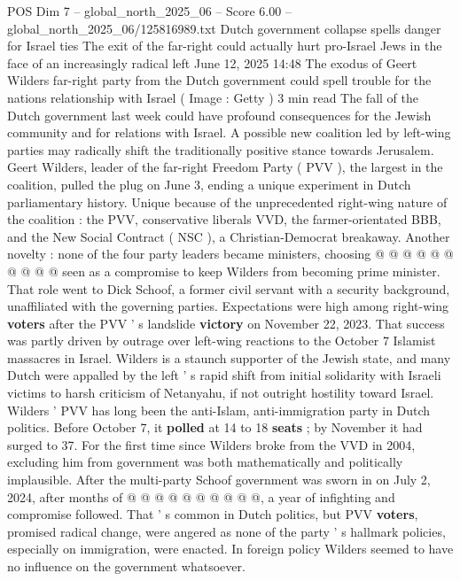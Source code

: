 \begin{textsample}{POS Dim 7 – global\_north\_2025\_06 – Score 6.00 – global\_north\_2025\_06/125816989.txt}  \label{ex:f7_pos_378}
Dutch government collapse spells danger for Israel ties The exit of the far-right could actually hurt pro-Israel Jews in the face of an increasingly radical left June 12, 2025 14:48 The exodus of Geert Wilders far-right party from the Dutch government could spell trouble for the nations relationship with Israel ( Image : Getty ) 3 min read The fall of the Dutch government last week could have profound consequences for the Jewish community and for relations with Israel.
A possible new coalition led by left-wing parties may radically shift the traditionally positive stance towards Jerusalem.
Geert Wilders, leader of the far-right Freedom Party ( PVV ), the largest in the coalition, pulled the plug on June 3, ending a unique experiment in Dutch parliamentary history.
Unique because of the unprecedented right-wing nature of the coalition : the PVV, conservative liberals VVD, the farmer-orientated BBB, and the New Social Contract ( NSC ), a Christian-Democrat breakaway.
Another novelty : none of the four party leaders became ministers, choosing @ @ @ @ @ @ @ @ @ @ seen as a compromise to keep Wilders from becoming prime minister.
That role went to Dick Schoof, a former civil servant with a security background, unaffiliated with the governing parties.
Expectations were high among right-wing \textbf{voters} after the PVV ' s landslide \textbf{victory} on November 22, 2023.
That success was partly driven by outrage over left-wing reactions to the October 7 Islamist massacres in Israel.
Wilders is a staunch supporter of the Jewish state, and many Dutch were appalled by the left ' s rapid shift from initial solidarity with Israeli victims to harsh criticism of Netanyahu, if not outright hostility toward Israel.
Wilders ' PVV has long been the anti-Islam, anti-immigration party in Dutch politics.
Before October 7, it \textbf{polled} at 14 to 18 \textbf{seats} ; by November it had surged to 37.
For the first time since Wilders broke from the VVD in 2004, excluding him from government was both mathematically and politically implausible.
After the multi-party Schoof government was sworn in on July 2, 2024, after months of @ @ @ @ @ @ @ @ @ @, a year of infighting and compromise followed.
That ' s common in Dutch politics, but PVV \textbf{voters}, promised radical change, were angered as none of the party ' s hallmark policies, especially on immigration, were enacted.
In foreign policy Wilders seemed to have no influence on the government whatsoever.

\end{textsample}
